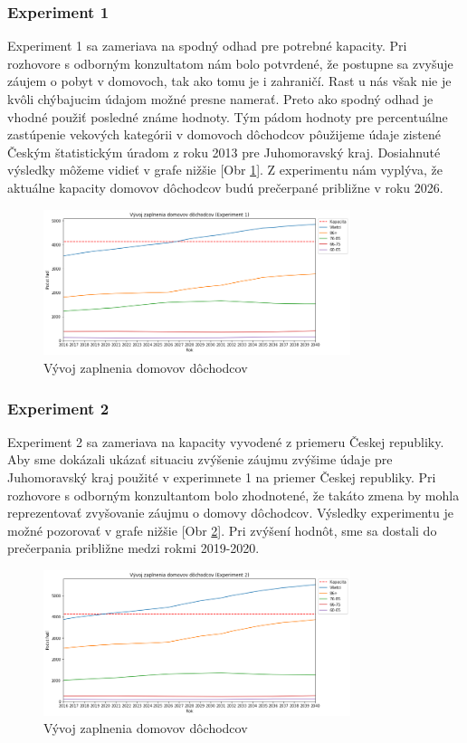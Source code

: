 \documentclass[a4paper, 11pt]{article}
\begin{document}
\subsubsection{Experiment 1}
Experiment 1 sa zameriava na spodný odhad pre potrebné kapacity. Pri rozhovore s odborným konzultatom nám bolo potvrdené, že postupne sa zvyšuje záujem o pobyt v domovoch, tak ako tomu je i zahraničí. Rast u nás však nie je kvôli chýbajucim údajom možné presne namerať. Preto ako spodný odhad je vhodné použiť posledné známe hodnoty. Tým pádom hodnoty pre percentuálne zastúpenie vekových kategórii v domovoch dôchodcov pôužijeme údaje zistené Českým štatistickým úradom z roku 2013 \cite{domovy2013} pre Juhomoravský kraj. Dosiahnuté výsledky môžeme vidieť v grafe nižšie [Obr \ref{exp_4}]. Z experimentu nám vyplýva, že aktuálne kapacity domovov dôchodcov budú prečerpané približne v roku 2026. 
\begin{figure}[H]
\centering
\includegraphics[width=0.8\textwidth]{exp_4}
\caption{Vývoj zaplnenia domovov dôchodcov\label{exp_4}}
\end{figure}

\subsubsection{Experiment 2}
Experiment 2 sa zameriava na kapacity vyvodené z priemeru Českej republiky. Aby sme dokázali ukázať situaciu zvýšenie záujmu zvýšime údaje pre Juhomoravský kraj použité v experimnete 1 na priemer Českej republiky. Pri rozhovore s odborným konzultantom bolo zhodnotené, že takáto zmena by mohla reprezentovať zvyšovanie záujmu o domovy dôchodcov. Výsledky experimentu je možné pozorovať v grafe nižšie [Obr \ref{exp_5}]. Pri zvýšení hodnôt, sme sa dostali do prečerpania približne medzi rokmi 2019-2020.
\begin{figure}[H]
\centering
\includegraphics[width=0.8\textwidth]{exp_5}
\caption{Vývoj zaplnenia domovov dôchodcov\label{exp_5}}
\end{figure}
\end{document}
